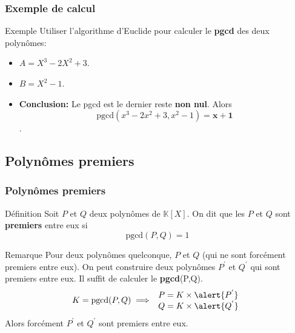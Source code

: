 \documentclass{beamer}
\newcommand{\setK}{\mathbb{K}}
\begin{document}
\begin{frame}[t]
  \frametitle{Exemple de calcul}
  \begin{block}{Exemple}
Utiliser l'algorithme d'Euclide pour calculer le \textbf{pgcd} des deux
polynômes: 
\begin{itemize}
  \small
  \item $ A = X^3 -2X^2 + 3$.
  \item $ B = X^2 - 1$.
\end{itemize}
\end{block}
 \pause
\begin{center}
  \small
\end{center}
\pause
\begin{itemize}
  \item \textbf{\alert{Conclusion:}}  Le pgcd est le dernier reste \textbf{non
    nul}. Alors $$\text{pgcd}(x^3 - 2x^2 + 3, x^2-1) = \mathbf{x+1}$$. 
\end{itemize}
\end{frame}
\subsection{Polynômes premiers}

\begin{frame}[t]
  \frametitle{Polynômes premiers}
  
  \begin{block}{Définition}
    \small
    Soit $P$ et $Q$ deux polynômes de $\setK[X]$. On dit que les $P$ et $Q$ sont
    \textbf{\alert{premiers}} entre eux si
    $$
    \text{pgcd}( P, Q) = 1
    $$
  \end{block}
  \pause
\begin{block}{Remarque}
  \small
  Pour deux polynômes quelconque, $P$ et $Q$ (qui ne sont forcément premiers
  entre eux). On peut construire deux polynômes $P^{'}$ et $Q^{'}$ qui sont
  premiers entre eux. Il suffit de calculer le \textbf{pgcd}(P,Q).\\

  \begin{equation}
    K = \text{pgcd}(P,Q)\implies \begin{array}{ll}
      P = K \times \alert{P^{'}}\\
      Q = K \times \alert{Q^{'}}
    \end{array}
  \end{equation}
  Alors forcément $P^{'}$ et $Q^{'}$ sont premiers entre eux.
\end{block}
\end{frame}
\end{document}

